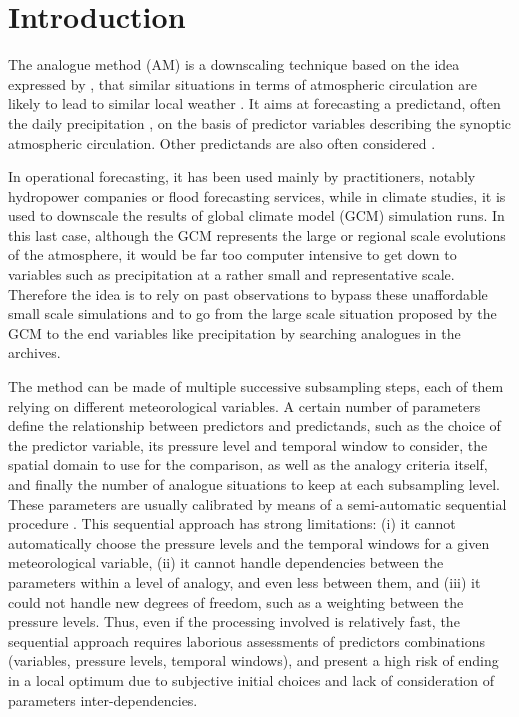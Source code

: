 \documentclass[5p]{elsarticle}
\begin{document}
\linenumbers

\section{Introduction}
\label{sec:intro}

The analogue method (AM) is a downscaling technique based on the idea expressed by \citet{Lorenz1956, Lorenz1969}, that similar situations in terms of atmospheric circulation are likely to lead to similar local weather \citep{Duband1970, Bontron2005}. It aims at forecasting a predictand, often the daily precipitation \citep[eg.][]{Guilbaud1997, Bontron2005, Bliefernicht2010, Marty2012, Horton2012, Radanovics2013, BenDaoud2015}, on the basis of predictor variables describing the synoptic atmospheric circulation. Other predictands are also often considered \citep[see][for a non-exhaustive list]{Horton2016}.

In operational forecasting, it has been used mainly by practitioners, notably hydropower companies or flood forecasting services, while in climate studies, it is used to downscale the results of global climate model (GCM) simulation runs. In this last case, although the GCM represents the large or regional scale evolutions of the atmosphere, it would be far too computer intensive to get down to variables such as precipitation at a rather small and representative scale. Therefore the idea is to rely on past observations to bypass these unaffordable small scale simulations and to go from the large scale situation proposed by the GCM to the end variables like precipitation by searching analogues in the archives. 

The method can be made of multiple successive subsampling steps, each of them relying on different meteorological variables. A certain number of parameters define the relationship between predictors and predictands, such as the choice of the predictor variable, its pressure level and temporal window to consider, the spatial domain to use for the comparison, as well as the analogy criteria itself, and finally the number of analogue situations to keep at each subsampling level. These parameters are usually calibrated by means of a semi-automatic sequential procedure \citep[see][for the details]{Bontron2004, Horton2016}. This sequential approach has strong limitations: (i) it cannot automatically choose the pressure levels and the temporal windows for a given meteorological variable, (ii) it cannot handle dependencies between the parameters within a level of analogy, and even less between them, and (iii) it could not handle new degrees of freedom, such as a weighting between the pressure levels. Thus, even if the processing involved is relatively fast, the sequential approach requires laborious assessments of predictors combinations (variables, pressure levels, temporal windows), and present a high risk of ending in a local optimum due to subjective initial choices and lack of consideration of parameters inter-dependencies.
\end{document}
